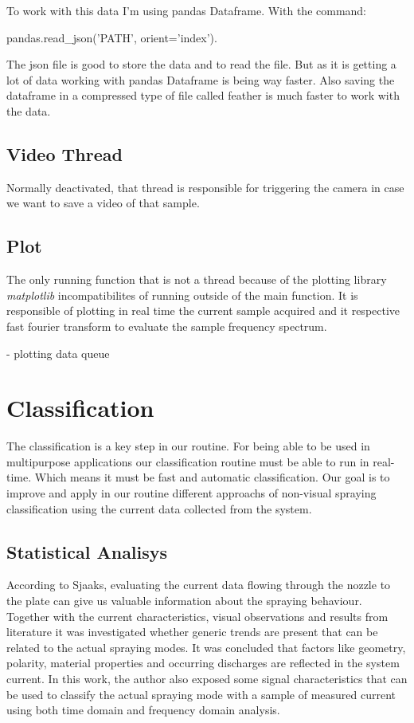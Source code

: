         To work with this data I'm using pandas Dataframe.
        With the command:
        
        pandas.read\_json('PATH', orient='index').
    
        The json file is good to store the data and to read the file. But as it is getting a lot of data working with pandas Dataframe is being way faster. Also saving the dataframe in a compressed
        type of file called feather is much faster to work with the data.
    
    \subsection{Video Thread}

        Normally deactivated, that thread is responsible for triggering the camera in case we want to save a video of that sample.
    
    \subsection{Plot}

        The only running function that is not a thread because of the plotting library \emph{matplotlib} incompatibilites of running outside of the main function. 
        It is responsible of plotting in real time the current sample acquired and it respective fast fourier transform to evaluate the sample frequency spectrum.
    
    
    - plotting data queue


\section{Classification}
\label{sec:section_classification}

The classification is a key step in our routine. For being able to be used in multipurpose applications our classification routine must be able to run in real-time. Which means it must be fast and automatic classification.
Our goal is to improve and apply in our routine different approachs of non-visual spraying classification using the current data collected from the system.

\subsection{Statistical Analisys}

 According to Sjaaks\cite{Sjaaks}, evaluating the current data flowing through the nozzle to the plate can give us valuable information about the spraying behaviour.
 Together with the current characteristics, visual observations and results from literature it was investigated whether generic trends are present that can be related to the actual spraying modes.
 It was concluded that factors like geometry, polarity, material properties and occurring discharges are reflected in the system current.
In this work, the author also exposed some signal characteristics that can be used to classify the actual spraying mode with a sample of measured current using both time domain and frequency domain analysis.


